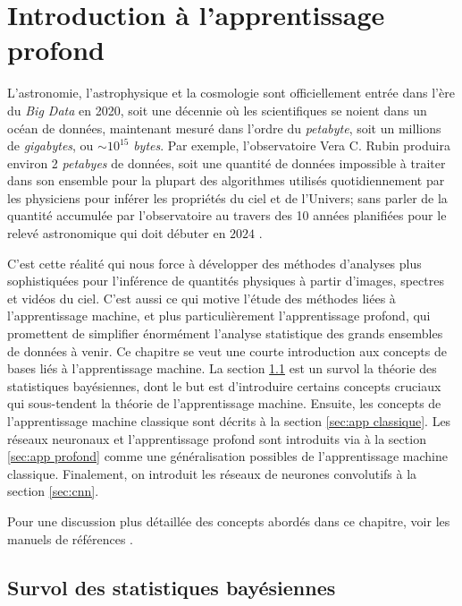 \chapter{Introduction à l'apprentissage profond}\label{chap:intro ml}

L'astronomie, l'astrophysique et la cosmologie sont officiellement entrée dans l'ère du \textit{Big Data} en 2020, 
soit une décennie où les scientifiques se noient dans 
un océan de données, maintenant mesuré dans l'ordre du \textit{petabyte}, soit un millions de \textit{gigabytes}, ou $\sim 10^{15}$ \textit{bytes}. 
Par exemple, l'observatoire Vera C. Rubin produira environ 2 \textit{petabyes} de données, soit une quantité de données 
impossible à traiter dans son ensemble pour la plupart des algorithmes utilisés quotidiennement par les physiciens pour inférer les propriétés du ciel 
et de l'Univers; sans parler de la quantité accumulée par l'observatoire au travers des 10 années planifiées pour le relevé astronomique qui doit débuter 
en $2024$ \citep{lsst2009,lsst2021}. 

C'est cette réalité qui nous force à développer des méthodes d'analyses plus sophistiquées pour l'inférence de quantités physiques à partir 
d'images, spectres et vidéos du ciel. C'est aussi ce qui motive l'étude des méthodes liées à l'apprentissage machine, et plus particulièrement 
l'apprentissage profond, qui promettent de simplifier énormément l'analyse statistique des grands ensembles de données à venir. Ce chapitre se veut 
une courte introduction aux concepts de bases liés à l'apprentissage machine. 
La section \ref{sec:bayes} est un survol la théorie des statistiques bayésiennes, dont le but est d'introduire certains concepts cruciaux qui sous-tendent la 
théorie de l'apprentissage machine. Ensuite, les concepts de l'apprentissage machine classique sont décrits à la section \ref{sec:app classique}. 
Les réseaux neuronaux et l'apprentissage profond sont introduits via à la section \ref{sec:app profond} 
comme une généralisation possibles de l'apprentissage machine classique. 
Finalement, on introduit les réseaux de neurones convolutifs à la section \ref{sec:cnn}. 

Pour une discussion plus détaillée des concepts abordés dans ce chapitre, voir les manuels de références \citet{BengioDeepLearningBook,}.

\section{Survol des statistiques bayésiennes}\label{sec:bayes}

